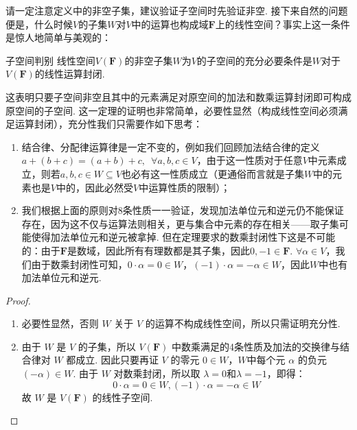 请一定注意定义中的非空子集，建议验证子空间时先验证非空. 接下来自然的问题便是，什么时候$V$的子集$W$对$V$中的运算也构成域$\mathbf{F}$上的线性空间？事实上这一条件是惊人地简单与美观的：
\begin{theorem}{}{子空间判别}
    线性空间$V(\mathbf{F})$的非空子集$W$为$V$的子空间的充分必要条件是$W$对于$V(\mathbf{F})$的线性运算封闭.
\end{theorem}

这表明只要子空间非空且其中的元素满足对原空间的加法和数乘运算封闭即可构成原空间的子空间. 这一定理的证明也非常简单，必要性显然（构成线性空间必须满足运算封闭），充分性我们只需要作如下思考：
\begin{enumerate}
    \item 结合律、分配律运算律是一定不变的，例如我们回顾加法结合律的定义$a+(b+c)=(a+b)+c,\enspace\forall a,b,c\in V$，由于这一性质对于任意$V$中元素成立，则若$a,b,c\in W\subseteq V$也必有这一性质成立（更通俗而言就是子集$W$中的元素也是$V$中的，因此必然受$V$中运算性质的限制）；

    \item 我们根据上面的原则对8条性质一一验证，发现加法单位元和逆元仍不能保证存在，因为这不仅与运算法则相关，更与集合中元素的存在相关——取子集可能使得加法单位元和逆元被拿掉. 但在定理要求的数乘封闭性下这是不可能的：由于$\mathbf{F}$是数域，因此所有有理数都是其子集，因此$0,-1\in\mathbf{F}$. $\forall \alpha\in V$，我们由于数乘封闭性可知，$0\cdot\alpha=0\in W$，$(-1)\cdot\alpha=-\alpha\in W$，因此$W$中也有加法单位元和逆元.
\end{enumerate}

\begin{proof}
    \begin{enumerate}
        \item 必要性显然，否则 $W$ 关于 $V$ 的运算不构成线性空间，所以只需证明充分性.
        \item 由于 $W$ 是 $V$ 的子集，所以 $V(\mathbf{F})$ 中数乘满足的4条性质及加法的交换律与结合律对 $W$ 都成立. 因此只要再证 $V$ 的零元 $0\in W$，$W$中每个元 $\alpha$ 的负元 $(-\alpha)\in W$. 由于 $W$ 对数乘封闭，所以取 $\lambda=0$和$\lambda=-1$，即得：
              \[ 0\cdot\alpha=0\in W,(-1)\cdot\alpha=-\alpha\in W \]
              故 $W$ 是 $V(\mathbf{F})$ 的线性子空间.
    \end{enumerate}
\end{proof}

